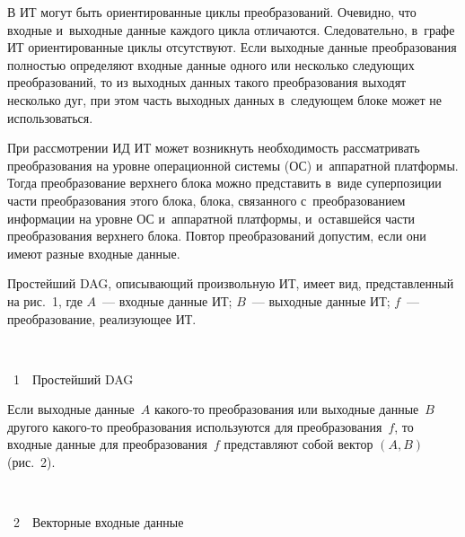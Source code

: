 \begin{multicols}{2}
  В ИТ могут быть ориентированные циклы преобразований. Очевидно, что 
входные и~выходные данные каждого цикла отличаются. Следовательно, в~графе 
ИТ ориентированные циклы отсутствуют. Если выходные данные преобразования 
полностью определяют входные данные одного или несколько следующих 
преобразований, то из выходных данных такого преобразования выходят 
несколько дуг, при этом часть выходных данных в~следующем блоке может не 
использоваться. 
  
  При рассмотрении ИД ИТ может возникнуть 
необходимость рас\-смат\-ри\-вать преобразования на уровне операционной
сис\-те\-мы (ОС) и~аппаратной 
платформы. Тогда преобразование верхнего блока можно представить в~виде 
суперпозиции час\-ти преобразования этого блока, блока, связанного 
с~преобразованием информации на уровне ОС и~аппаратной платформы, 
и~оставшейся части преобразования верхнего блока. Повтор преобразований 
допустим, если они имеют разные входные данные. 
  
  Простейший DAG, описывающий произвольную ИТ, имеет вид, 
представленный на рис.~1, где $A$~--- входные данные ИТ; $B$~--- выходные 
данные ИТ; $f$~--- преобразование, реализующее ИТ. 

{ \begin{center}  %
 \vspace*{3pt}
    \mbox{%
 \epsfxsize=45mm 
 }
\vspace*{6pt}

\noindent
{{\figurename~1}\ \ \small{Простейший DAG}
}
\end{center}
}




  Если выходные данные~$A$ какого-то преобразования или выходные 
данные~$B$ другого какого-то преобразования используются для 
преобразования~$f$, то входные данные для преобразования~$f$ представляют 
собой вектор $(A, B)$ (рис.~2). 

{ \begin{center}  %
 \vspace*{3pt}
   \mbox{%
 \epsfxsize=79mm 
 }
\vspace*{6pt}

\noindent
{{\figurename~2}\ \ \small{Векторные входные данные 
}}

\end{center}
}




\end{multicols}
